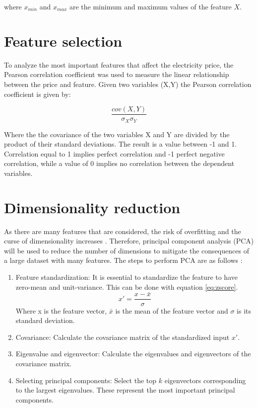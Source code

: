 where $x_{min}$ and $x_{max}$ are the minimum and maximum values of the feature $X$. 

\section{Feature selection}
To analyze the most important features that affect the electricity price, the Pearson correlation coefficient was used to measure the linear relationship between the price and feature. Given two variables (X,Y) the Pearson correlation coefficient is given by:

\begin{equation}
    \frac{cov(X,Y)}{\sigma_{X}\sigma_{Y}}
\end{equation}

Where the the covariance of the two variables X and Y are divided by the product of their
standard deviations. The result is a value between -1 and 1. Correlation equal to 1
implies perfect correlation and -1 perfect negative correlation, while a value of 0 implies no correlation between the dependent variables. 

\section{Dimensionality reduction}
As there are many features that are considered, the risk of overfitting and the curse of dimensionality increases \cite{goodfellow}. Therefore, principal component analysis (PCA) \cite{goodfellow} will be used to reduce the number of dimensions to mitigate the consequences of a large dataset with many features. The steps to perform PCA are as follows \cite{goodfellow}:

\begin{enumerate}
    \item Feature standardization: It is essential to standardize the feature to have zero-mean and unit-variance. This can be done with equation \ref{eq:zscore}. 
    \begin{equation}\label{eq:zscore}
        x' = \frac{x-\bar{x}}{\sigma}
    \end{equation}
    Where x is the feature vector, $\bar{x}$ is the mean of the feature vector and $\sigma$ is its standard deviation. 
    \item Covariance: Calculate the covariance matrix of the standardized input $x'$.
    \item Eigenvalue and eigenvector: Calculate the eigenvalues and eigenvectors of the covariance matrix. 
    \item Selecting principal components: Select the top $k$ eigenvectors corresponding to the largest eigenvalues. These represent the most important principal components.
\end{enumerate}

